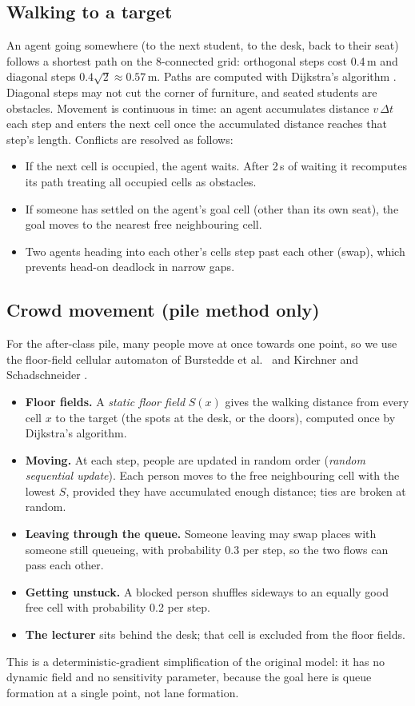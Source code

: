 \documentclass[11pt,a4paper]{article}
\begin{document}
\subsection{Walking to a target}
An agent going somewhere (to the next student, to the desk, back to their seat) follows a shortest path on the 8-connected grid: orthogonal steps cost 0.4\,m and diagonal steps $0.4\sqrt2 \approx 0.57$\,m.
Paths are computed with Dijkstra's algorithm \cite{dijkstra1959}. Diagonal steps may not cut the corner of furniture, and seated students are obstacles.
Movement is continuous in time: an agent accumulates distance $v\,\Delta t$ each step and enters the next cell once the accumulated distance reaches that step's length.
Conflicts are resolved as follows:
\begin{itemize}
  \item If the next cell is occupied, the agent waits. After 2\,s of waiting it recomputes its path treating all occupied cells as obstacles.
  \item If someone has settled on the agent's goal cell (other than its own seat), the goal moves to the nearest free neighbouring cell.
  \item Two agents heading into each other's cells step past each other (swap), which prevents head-on deadlock in narrow gaps.
\end{itemize}

\subsection{Crowd movement (pile method only)}
For the after-class pile, many people move at once towards one point, so we use the floor-field cellular automaton of Burstedde et al.\ \cite{burstedde2001} and Kirchner and Schadschneider \cite{kirchner2002}.
\begin{itemize}
  \item \textbf{Floor fields.} A \emph{static floor field} $S(x)$ gives the walking distance from every cell $x$ to the target (the spots at the desk, or the doors), computed once by Dijkstra's algorithm.
  \item \textbf{Moving.} At each step, people are updated in random order (\emph{random sequential update}). Each person moves to the free neighbouring cell with the lowest $S$, provided they have accumulated enough distance; ties are broken at random.
  \item \textbf{Leaving through the queue.} Someone leaving may swap places with someone still queueing, with probability 0.3 per step, so the two flows can pass each other.
  \item \textbf{Getting unstuck.} A blocked person shuffles sideways to an equally good free cell with probability 0.2 per step.
  \item \textbf{The lecturer} sits behind the desk; that cell is excluded from the floor fields.
\end{itemize}
This is a deterministic-gradient simplification of the original model: it has no dynamic field and no sensitivity parameter, because the goal here is queue formation at a single point, not lane formation.
\end{document}
